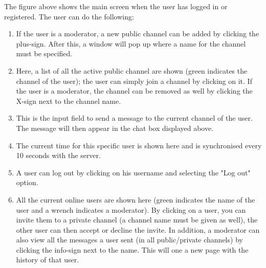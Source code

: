 \documentclass[11pt]{article}
\begin{document}
The figure above shows the main screen when the user has logged in or registered. The user can do the following:

\begin{enumerate}
	\item If the user is a moderator, a new public channel can be added by clicking the plus-sign. After this, a window will pop up where a name for the channel must be specified.
	\item Here, a list of all the active public channel are shown (green indicates the channel of the user); the user can simply join a channel by clicking on it. If the user is a moderator, the channel can be removed as well by clicking the X-sign next to the channel name.
	\item This is the input field to send a message to the current channel of the user. The message will then appear in the chat box displayed above.
	\item The current time for this specific user is shown here and is synchronised every 10 seconds with the server.
	\item A user can log out by clicking on his username and selecting the "Log out" option.
	\item All the current online users are shown here (green indicates the name of the user and a wrench indicates a moderator). By clicking on a user, you can invite them to a private channel (a channel name must be given as well), the other user can then accept or decline the invite. In addition, a moderator can also view all the messages a user sent (in all public/private channels) by clicking the info-sign next to the name. This will one a new page with the history of that user.
\end{enumerate}
\end{document}
